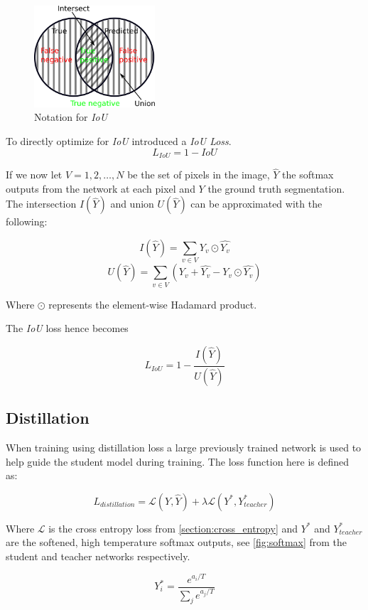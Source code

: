 \documentclass{kththesis}
\begin{document}
\begin{figure}[h]
  \centering
  \includegraphics[width=0.40\textwidth]{IoU}
  \caption{Notation for \textit{IoU}}
  \label{fig:IoU}
\end{figure}


To directly optimize for \textit{IoU} \textcite{rahman2016optimizing} introduced
a \textit{IoU Loss}.
\[L_{IoU} = 1 - \textit{IoU}\]

If we now let \(V = {1, 2, \dots, N}\) be the set of pixels in the image, \(\hat{Y}\)
the softmax outputs from the network at each pixel and \(Y\) the ground truth
segmentation. The intersection \(I(\hat{Y})\) and union \(U(\hat{Y})\) can be
approximated with the following:

\[I(\hat{Y}) = \sum_{v \in V} Y_v \odot \hat{Y_v}\]
\[U(\hat{Y}) = \sum_{v \in V}\left( Y_v + \hat{Y_v} - Y_v \odot \hat{Y_v} \right) \]

Where \(\odot\) represents the element-wise Hadamard product.

The \textit{IoU} loss hence becomes

\[L_{\textit{IoU}} = 1 - \frac{I(\hat{Y})}{U(\hat{Y})}\]


\subsection{Distillation}
When training using distillation loss \parencite{hinton2015distilling} a large
previously trained network is used to help guide the student model during
training. The loss function here is defined as:

\[L_{distillation} = \mathcal{L}(Y, \hat{Y}) + \lambda\mathcal{L}(Y^*, Y_{teacher}^*)\]

Where \(\mathcal{L}\) is the cross entropy loss from
\cref{section:cross_entropy} and \(Y^*\) and \(Y^*_{teacher}\) are the softened,
high temperature softmax outputs, see \cref{fig:softmax} from the student and teacher networks
respectively.

\[Y_i^* = \frac{e^{a_i/T}}{\sum_j e^{a_j/T}}\]
\end{document}
